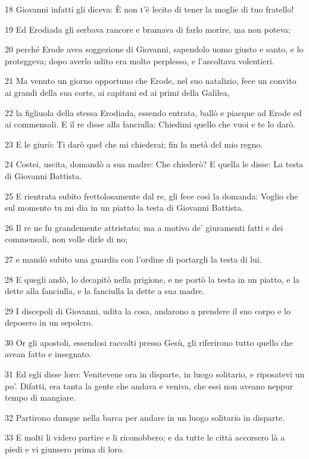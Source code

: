\par 18 Giovanni infatti gli diceva: È non t'è lecito di tener la moglie di tuo fratello!
\par 19 Ed Erodiada gli serbava rancore e bramava di farlo morire, ma non poteva;
\par 20 perché Erode avea soggezione di Giovanni, sapendolo uomo giusto e santo, e lo proteggeva; dopo averlo udito era molto perplesso, e l'ascoltava volentieri.
\par 21 Ma venuto un giorno opportuno che Erode, nel suo natalizio, fece un convito ai grandi della sua corte, ai capitani ed ai primi della Galilea,
\par 22 la figliuola della stessa Erodiada, essendo entrata, ballò e piacque ad Erode ed ai commensali. E il re disse alla fanciulla: Chiedimi quello che vuoi e te lo darò.
\par 23 E le giurò: Ti darò quel che mi chiederai; fin la metà del mio regno.
\par 24 Costei, uscita, domandò a sua madre: Che chiederò? E quella le disse: La testa di Giovanni Battista.
\par 25 E rientrata subito frettolosamente dal re, gli fece così la domanda: Voglio che sul momento tu mi dia in un piatto la testa di Giovanni Battista.
\par 26 Il re ne fu grandemente attristato; ma a motivo de' giuramenti fatti e dei commensali, non volle dirle di no;
\par 27 e mandò subito una guardia con l'ordine di portargli la testa di lui.
\par 28 E quegli andò, lo decapitò nella prigione, e ne portò la testa in un piatto, e la dette alla fanciulla, e la fanciulla la dette a sua madre.
\par 29 I discepoli di Giovanni, udita la cosa, andarono a prendere il suo corpo e lo deposero in un sepolcro.
\par 30 Or gli apostoli, essendosi raccolti presso Gesù, gli riferirono tutto quello che avean fatto e insegnato.
\par 31 Ed egli disse loro: Venitevene ora in disparte, in luogo solitario, e riposatevi un po'. Difatti, era tanta la gente che andava e veniva, che essi non aveano neppur tempo di mangiare.
\par 32 Partirono dunque nella barca per andare in un luogo solitario in disparte.
\par 33 E molti li videro partire e li riconobbero; e da tutte le città accorsero là a piedi e vi giunsero prima di loro.
